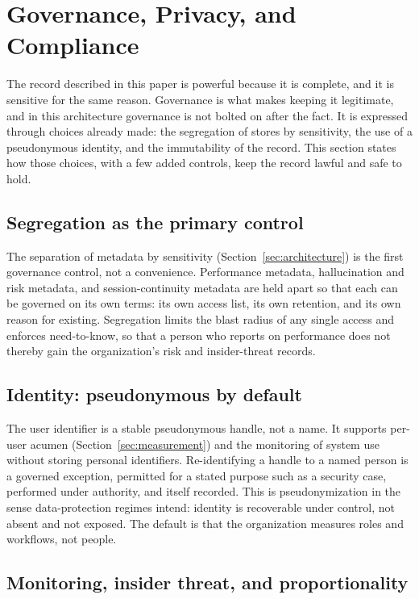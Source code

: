 \documentclass[11pt]{article}
\begin{document}
\section{Governance, Privacy, and Compliance}
\label{sec:governance}

The record described in this paper is powerful because it is complete, and it is
sensitive for the same reason. Governance is what makes keeping it legitimate, and
in this architecture governance is not bolted on after the fact. It is expressed
through choices already made: the segregation of stores by sensitivity, the use of
a pseudonymous identity, and the immutability of the record. This section states
how those choices, with a few added controls, keep the record lawful and safe to
hold.

\subsection{Segregation as the primary control}

The separation of metadata by sensitivity (Section~\ref{sec:architecture}) is the
first governance control, not a convenience. Performance metadata, hallucination
and risk metadata, and session-continuity metadata are held apart so that each can
be governed on its own terms: its own access list, its own retention, and its own
reason for existing. Segregation limits the blast radius of any single access and
enforces need-to-know, so that a person who reports on performance does not thereby
gain the organization's risk and insider-threat records.

\subsection{Identity: pseudonymous by default}

The user identifier is a stable pseudonymous handle, not a name. It supports
per-user acumen (Section~\ref{sec:measurement}) and the monitoring of system use
without storing personal identifiers. Re-identifying a handle to a named person is
a governed exception, permitted for a stated purpose such as a security case,
performed under authority, and itself recorded. This is pseudonymization in the
sense data-protection regimes intend: identity is recoverable under control, not
absent and not exposed. The default is that the organization measures roles and
workflows, not people.

\subsection{Monitoring, insider threat, and proportionality}
\end{document}
